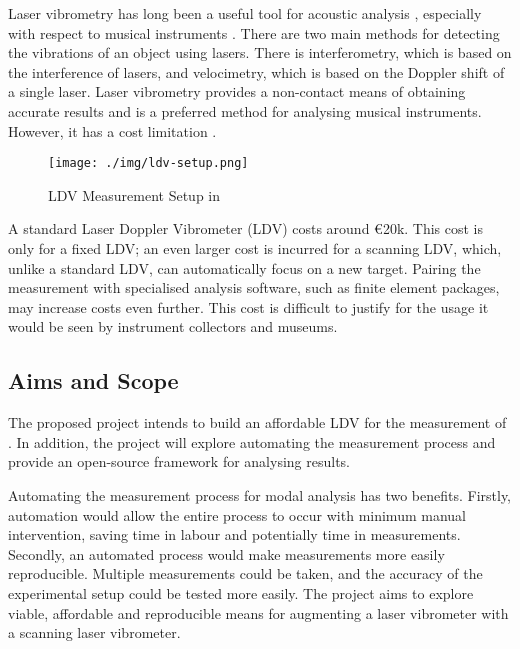 Laser vibrometry has long been a useful tool for acoustic analysis
\cite{SRIRIAM}, especially with respect to musical instruments \cite{HENNA,GUITAR_3D_SCAN,VIOLIN_3D_SCAN,MANSOUR}. There are two main methods for detecting the vibrations of an object using lasers. There is interferometry, which is based on the interference of lasers, and velocimetry, which is based on the Doppler shift of a single laser.  Laser vibrometry
provides a non-contact means of obtaining accurate results and is a preferred method for analysing musical instruments. However, it has a cost limitation \cite{DUERINCK}. 

\begin{figure}[h]
  \centering
  \texttt{[image: ./img/ldv-setup.png]}
  \caption{LDV Measurement Setup in \cite{MANSOUR}}
  \label{fig:ldv-setup}
\end{figure}

A standard Laser Doppler Vibrometer (LDV) costs around €20k. This cost is only for a fixed LDV; an even larger cost is incurred for a scanning LDV, which, unlike a standard LDV, can automatically focus on a new target. Pairing the measurement with specialised analysis software, such as finite element packages, may increase costs even further. This cost is difficult to justify for the usage it would be seen by instrument collectors and museums. 

\subsection{Aims and Scope}


The proposed project intends to build an affordable LDV for the measurement of . In addition, the project will explore automating the measurement process and provide an open-source framework for analysing results.


Automating the measurement process for modal analysis has two benefits. Firstly, automation would allow the entire process to occur with
minimum manual intervention, saving time in labour and potentially time in
measurements. Secondly, an automated process would make
measurements more easily reproducible. Multiple measurements could be
taken, and the accuracy of the experimental setup could be tested more easily. The project aims to explore viable, affordable and reproducible means for augmenting a laser vibrometer with a scanning laser vibrometer.

